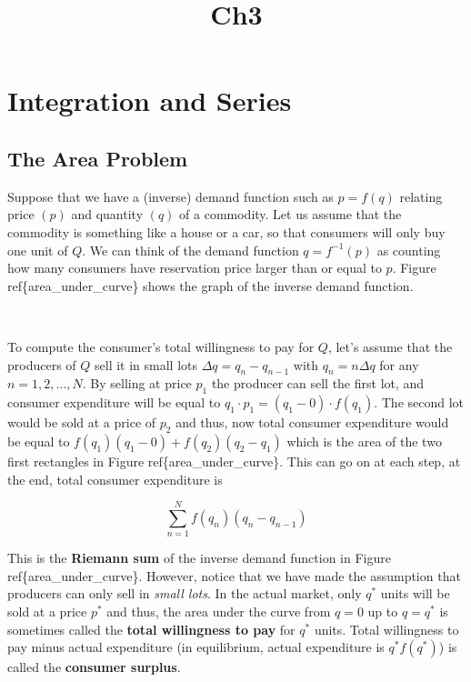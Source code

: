 \documentclass[11pt]{article}
\title{Ch3}
\begin{document}
    
    
    \maketitle
    
    

    
    \hypertarget{integration-and-series}{%
\section{Integration and Series}\label{integration-and-series}}

\hypertarget{the-area-problem}{%
\subsection{The Area Problem}\label{the-area-problem}}

Suppose that we have a (inverse) demand function such as \(p = f(q)\)
relating price \((p)\) and quantity \((q)\) of a commodity. Let us
assume that the commodity is something like a house or a car, so that
consumers will only buy one unit of \(Q\). We can think of the demand
function \(q = f^{-1}(p)\) as counting how many consumers have
reservation price larger than or equal to \(p\). Figure
ref\{area\_under\_curve\} shows the graph of the inverse demand
function.

    \begin{center}
    \end{center}
    { \hspace*{\fill} \\}
    
    To compute the consumer's total willingness to pay for \(Q\), let's
assume that the producers of \(Q\) sell it in small lots
\(\Delta q = q_{n} - q_{n-1}\) with \(q_n = n\Delta q\) for any
\(n = 1,2,\ldots,N\). By selling at price \(p_1\) the producer can sell
the first lot, and consumer expenditure will be equal to
\(q_1 \cdot p_1 = (q_1-0)\cdot f(q_1)\). The second lot would be sold at
a price of \(p_2\) and thus, now total consumer expenditure would be
equal to \(f(q_1)(q_1 - 0) + f(q_2)(q_2 - q_1)\) which is the area of
the two first rectangles in Figure ref\{area\_under\_curve\}. This can
go on at each step, at the end, total consumer expenditure is

\[
\sum^N_{n=1} f(q_n)(q_n - q_{n-1})
\]

This is the \textbf{Riemann sum} of the inverse demand function in
Figure ref\{area\_under\_curve\}. However, notice that we have made the
assumption that producers can only sell in \emph{small lots}. In the
actual market, only \(q^*\) units will be sold at a price \(p^*\) and
thus, the area under the curve from \(q = 0\) up to \(q = q^*\) is
sometimes called the \textbf{total willingness to pay} for \(q^*\)
units. Total willingness to pay minus actual expenditure (in
equilibrium, actual expenditure is \(q^* f(q^*)\)) is called the
\textbf{consumer surplus}.
\end{document}
